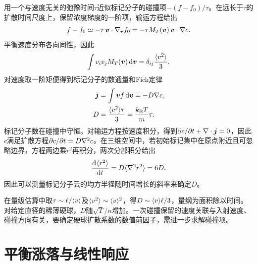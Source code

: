 用一个与速度无关的弛豫时间$\tau$近似标记分子的碰撞项$-(f - f_0)/\tau$。在远长于$\tau$的扩散时间尺度上，保留浓度梯度的一阶项，输运方程给出
\[
	f - f_0 \simeq -\tau\,\bm v \cdot \nabla_{\bm r} f_0
	= -\tau M_T(\bm v)\,\bm v \cdot \nabla c.
\]
平衡速度分布各向同性，因此
\[
	\int v_i v_jM_T(\bm v)\mathop{}\!\mathrm{d}\bm v = \delta_{ij}\frac{\langle v^2\rangle}{3}.
\]
对速度取一阶矩便得到标记分子的数通量和Fick定律
\begin{subequations}
	\begin{align}
		\bm j &= \int \bm v f\mathop{}\!\mathrm{d}\bm v = -D\nabla c,\\
		D &= \frac{\langle v^2\rangle\tau}{3} = \frac{k_{\mathrm{B}} T}{m}\tau .
	\end{align}
\end{subequations}
标记分子数在碰撞中守恒。对输运方程按速度积分，得到$\partial c/\partial t + \nabla\cdot\bm j = 0$，因此$c$满足扩散方程$\partial c/\partial t = D\nabla^2 c$。在三维空间中，若初始标记集中在原点附近且可忽略边界，方程两边乘$r^2$再积分，两次分部积分给出
\begin{equation}
	\label{eq:sm-three-dimensional-diffusion-msd}
	\frac{\mathop{}\!\mathrm{d}^{}\langle r^2\rangle}{\mathrm{d}{t}^{}} = D\langle\nabla^2 r^2\rangle = 6D.
\end{equation}
因此可以测量标记分子云的均方半径随时间增长的斜率来确定$D$。

在量级估算中取$\tau \sim \ell/\langle v\rangle$及$\langle v^2\rangle \sim \langle v\rangle^2$，得$D \sim \langle v\rangle\ell/3$，量纲为面积除以时间。对给定直径的稀薄硬球，$D$随$\sqrt T/n$增加。一次碰撞保留的速度关联与入射速度、碰撞方向有关，要确定硬球扩散系数的数值前因子，需进一步求解碰撞项。

\section{平衡涨落与线性响应}\label{sec:linear-response}


